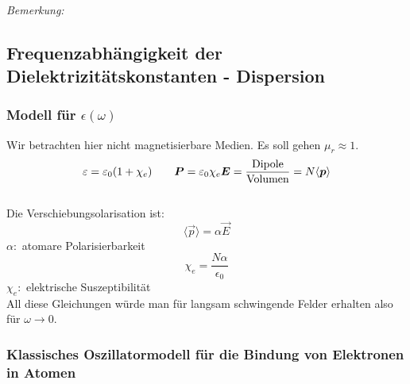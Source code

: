 \\
\emph{Bemerkung:}

\subsection{Frequenzabhängigkeit der Dielektrizitätskonstanten - Dispersion}

\subsubsection{Modell für $ \epsilon(\omega) $}

Wir betrachten hier nicht magnetisierbare Medien. Es soll gehen $ \mu_r \approx 1 $.
\begin{equation*}
\varepsilon = \varepsilon_0 (1 + \chi_e) \qquad \bm{P} = \varepsilon_0 \chi_e \bm{E} = \frac{\textrm{Dipole}}{\textrm{Volumen}} = N \langle \bm{p} \rangle
\end{equation*}
\\[5pt]
Die Verschiebungsolarisation ist:
\begin{equation*}
\langle \vec{p} \rangle = \alpha \vec{E}
\end{equation*}
$ \alpha : $ atomare Polarisierbarkeit
\begin{equation*}
\chi_e = \frac{N \alpha}{\epsilon_0}
\end{equation*}
$ \chi_e : $ elektrische Suszeptibilität\\
All diese Gleichungen würde man für langsam schwingende Felder erhalten also für $ \omega \to 0 $.\\

\subsubsection{Klassisches Oszillatormodell für die Bindung von Elektronen in Atomen}

